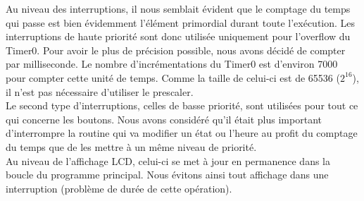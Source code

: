 Au niveau des interruptions, il nous semblait évident que le comptage du temps qui passe est bien évidemment l'élément primordial durant toute l'exécution. Les interruptions de haute priorité sont donc utilisée uniquement pour l'overflow du Timer0. Pour avoir le plus de précision possible, nous avons décidé de compter par milliseconde. Le nombre d'incrémentations du Timer0 est d'environ 7000 pour compter cette unité de temps. Comme la taille de celui-ci est de 65536 ($2^{16}$), il n'est pas nécessaire d'utiliser le prescaler.\\
Le second type d'interruptions, celles de basse priorité, sont utilisées pour tout ce qui concerne les boutons. Nous avons considéré qu'il était plus important d'interrompre la routine qui va modifier un état ou l'heure au profit du comptage du temps que de les mettre à un m\^{e}me niveau de priorité.\\
Au niveau de l'affichage LCD, celui-ci se met à jour en permanence dans la boucle du programme principal. Nous évitons ainsi tout affichage dans une interruption (problème de durée de cette opération).